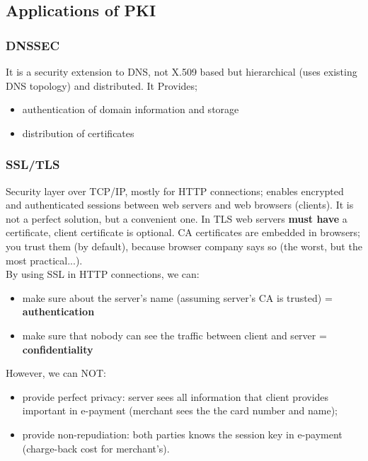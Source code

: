 \documentclass[a4paper, 10pt, titlepage]{article}
\begin{document}
\subsection{Applications of PKI}
\subsubsection{DNSSEC}
It is a security extension to DNS, not X.509 based but hierarchical (uses existing DNS topology) and distributed. It Provides;
\begin{itemize}
\item authentication of domain information and storage
\item distribution of certificates
\end{itemize}
\subsubsection{SSL/TLS}
\label{section:tls}
Security layer over TCP/IP, mostly for HTTP connections; enables encrypted and authenticated sessions between web servers and web browsers (clients). It is not a perfect solution, but a convenient one. In TLS web servers \textbf{must have} a certificate, client certificate is optional. CA certificates are embedded in browsers; you trust them (by default), because browser company says so (the worst, but the most practical...).\medskip\\
By using SSL in HTTP connections, we can:
\begin{itemize}
\item make sure about the server’s name (assuming server's CA is trusted) = \textbf{authentication}
\item make sure that nobody can see the traffic between client and server = \textbf{confidentiality}
\end{itemize}
However, we can NOT:
\begin{itemize}
\item provide perfect privacy: server sees all information that client provides important in e-payment (merchant sees the the card number and name);
\item provide non-repudiation: both parties knows the session key
in e-payment (charge-back cost for merchant’s).
\end{itemize}
\end{document}
